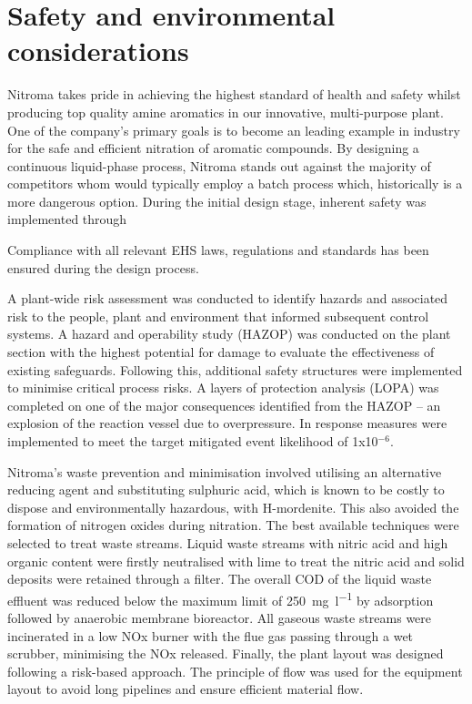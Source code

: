 \section*{Safety and environmental considerations}

Nitroma takes pride in achieving the highest standard of health and safety whilst producing top quality amine aromatics in our innovative, multi-purpose plant. One of the company's primary goals is to become an leading example in industry for the safe and efficient nitration of aromatic compounds. By designing a continuous liquid-phase process, Nitroma stands out against the majority of competitors whom would typically employ a batch process which, historically is a more dangerous option. During the initial design stage, inherent safety was implemented through 



 


 Compliance with all relevant EHS laws, regulations and standards has been ensured during the design process. 
 
 A plant-wide risk assessment was conducted to identify hazards and associated risk to the people, plant and environment that informed subsequent control systems. A hazard and operability study (HAZOP) was conducted on the plant section with the highest potential for damage to evaluate the effectiveness of existing safeguards. Following this, additional safety structures were implemented to minimise critical process risks. A layers of protection analysis (LOPA) was completed on one of the major consequences identified from the HAZOP – an explosion of the reaction vessel due to overpressure. In response measures were implemented to meet the target mitigated event likelihood of 1x10$^{-6}$.  

Nitroma's waste prevention and minimisation involved utilising an alternative reducing agent and substituting sulphuric acid, which is known to be costly to dispose and environmentally hazardous, with H-mordenite. This also avoided the formation of nitrogen oxides during nitration. The best available techniques  were selected to treat waste streams. Liquid waste streams with nitric acid and high organic content were firstly neutralised with lime to treat the nitric acid and solid deposits were retained through a filter. The overall COD of the liquid waste effluent was reduced below the maximum limit of \SI{250}{\mg\per\litre} by adsorption followed by anaerobic membrane bioreactor. All gaseous waste streams were incinerated in a low NOx burner with the flue gas passing through a wet scrubber, minimising the NOx released. Finally, the plant layout was designed following a risk-based approach. The principle of flow was used for the equipment layout to avoid long pipelines and ensure efficient material flow. 